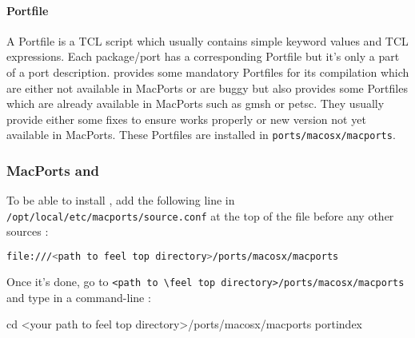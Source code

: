 \paragraph{Portfile}
A Portfile is a TCL script which usually contains simple keyword values and TCL expressions. Each package/port has a corresponding Portfile but it's only a part of a port description.
\feel provides some mandatory Portfiles for its compilation which are either not available in MacPorts or are buggy but \feel also provides some Portfiles which are already available in MacPorts such as gmsh or petsc. They usually provide either some fixes to ensure \feel works properly or new version not yet available in MacPorts.
These Portfiles are installed in \verb|ports/macosx/macports|.


\subsubsection{MacPorts and \Feel}


To be able to install \feel, add the following line in \verb|/opt/local/etc/macports/source.conf|
at the top of the file before any other sources :
\begin{lstlisting}[language=sh]
file:///<path to feel top directory>/ports/macosx/macports
\end{lstlisting}

Once it's done, go to \verb|<path to \feel top directory>/ports/macosx/macports| and type in a command-line :
\begin{unixcom}
		cd <your path to feel top directory>/ports/macosx/macports
		portindex
\end{unixcom}

